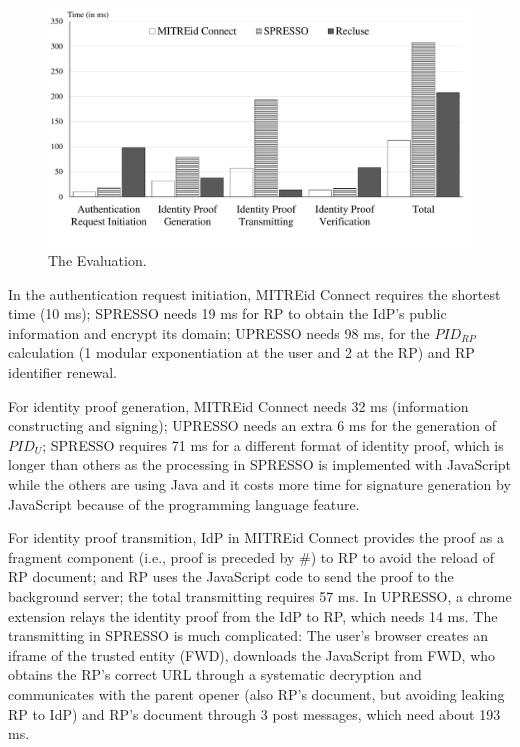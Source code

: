 \begin{figure}
  \centering
  \includegraphics[width=\linewidth]{fig/evaluation2.pdf}
  \caption{The Evaluation.}
  \label{fig:evaluation}
\end{figure}
In the authentication request initiation, MITREid Connect requires the shortest time (10 ms); SPRESSO needs 19 ms for RP to obtain the IdP's public information and encrypt its domain; UPRESSO needs 98 ms, for the $PID_{RP}$ calculation (1 modular exponentiation at the user and 2 at the RP) and RP identifier renewal.

For identity proof generation, MITREid Connect needs 32 ms (information constructing and signing); UPRESSO needs an extra 6 ms for the generation of $PID_U$;  SPRESSO requires 71 ms for a different format of identity proof, which is longer than others as the processing in SPRESSO is implemented with JavaScript while the others are using Java and it costs more time for signature generation by JavaScript because of the programming language feature.

For identity proof transmition, IdP in  MITREid Connect provides the proof as a fragment component (i.e., proof is preceded by \#) to RP to avoid the reload of RP document; and RP uses the JavaScript code to send the proof to the background server; the total transmitting requires 57 ms. In UPRESSO, a chrome extension relays the identity proof from the IdP to RP, which needs 14 ms. The transmitting in SPRESSO is much complicated: The user's browser creates an iframe of the trusted entity (FWD), downloads the JavaScript from FWD, who obtains the RP's correct URL through a systematic decryption and communicates with the parent opener (also RP's document, but avoiding leaking RP to IdP) and RP's document through 3 post messages, which need about 193 ms.

